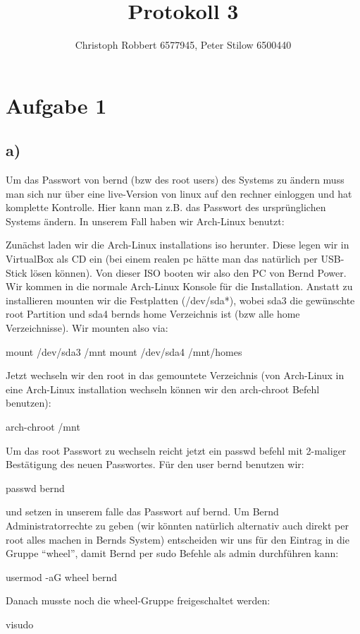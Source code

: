 \documentclass[10pt,a4paper]{article}
\author{Christoph Robbert 6577945, Peter Stilow 6500440}
\title{Protokoll 3}
\begin{document}
\maketitle
 
\section*{Aufgabe 1}
\subsection*{a)}

Um das Passwort von bernd (bzw des root users) des Systems zu ändern muss man sich nur über eine live-Version von linux auf den rechner einloggen und hat komplette Kontrolle. Hier kann man z.B. das Passwort des ursprünglichen Systems ändern. In unserem Fall haben wir Arch-Linux benutzt:

Zunächst laden wir die Arch-Linux installations iso herunter. Diese legen wir in VirtualBox als CD ein (bei einem realen pc hätte man das natürlich per USB-Stick lösen können). Von dieser ISO booten wir also den PC von Bernd Power. Wir kommen in die normale Arch-Linux Konsole für die Installation. Anstatt zu installieren mounten wir die Festplatten (/dev/sda*), wobei sda3 die gewünschte root Partition und sda4 bernds home Verzeichnis ist (bzw alle home Verzeichnisse). Wir mounten also via:

mount /dev/sda3 /mnt
mount /dev/sda4 /mnt/homes

Jetzt wechseln wir den root in das gemountete Verzeichnis (von Arch-Linux in eine Arch-Linux installation wechseln können wir den arch-chroot Befehl benutzen):

arch-chroot /mnt

Um das root Passwort zu wechseln reicht jetzt ein passwd befehl mit 2-maliger Bestätigung des neuen Passwortes. Für den user bernd benutzen wir:

passwd bernd

und setzen in unserem falle das Passwort auf bernd. Um Bernd Administratorrechte zu geben (wir könnten natürlich alternativ auch direkt per root alles machen in Bernds System) entscheiden wir uns für den Eintrag in die Gruppe "`wheel"', damit Bernd per sudo Befehle als admin durchführen kann:

usermod -aG wheel bernd

Danach musste noch die wheel-Gruppe freigeschaltet werden:

visudo
\end{document}
